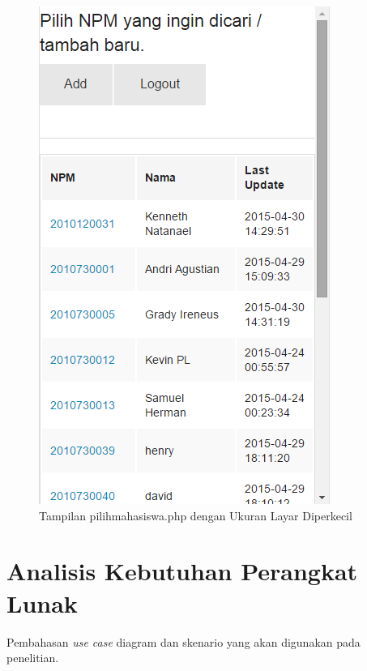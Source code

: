 \begin{figure}[ht]
\centering
\includegraphics[scale=0.5]{Gambar/contohzurb1.png}
\caption[Tampilan pilihmahasiswa.php dengan Ukuran Layar Diperkecil]{Tampilan pilihmahasiswa.php dengan Ukuran Layar Diperkecil}
\label{fig:contohzurb1}
\end{figure}

\section{Analisis Kebutuhan Perangkat Lunak}
\label{sec:analisiskebutuhanperangkatlunak}

Pembahasan {\it use case} diagram dan skenario yang akan digunakan pada
penelitian.

